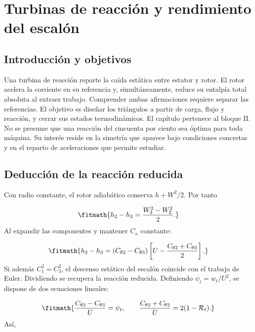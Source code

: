 \documentclass[10pt,openany]{book}
\begin{document}
\studiumchaptercheck

\chapter{Turbinas de reacción y rendimiento del escalón}
\label{chap:c05}


\section{Introducción y objetivos}

Una turbina de reacción reparte la caída estática entre estator y rotor. El rotor acelera la corriente en su referencia y, simultáneamente, reduce su entalpía total absoluta al extraer trabajo. Comprender ambas afirmaciones requiere separar las referencias. El objetivo es diseñar los triángulos a partir de carga, flujo y reacción, y cerrar sus estados termodinámicos.
El capítulo pertenece al bloque II. No se presume que una reacción del cincuenta por ciento sea óptima para toda máquina. Su interés reside en la simetría que aparece bajo condiciones concretas y en el reparto de aceleraciones que permite estudiar.

\section{Deducción de la reacción reducida}


Con radio constante, el rotor adiabático conserva \(h+W^2/2\). Por tanto



\[
\fitmath{h_2-h_3=\frac{W_3^2-W_2^2}{2}.}
\]
Al expandir las componentes y mantener \(C_x\) constante:

\[
\fitmath{h_2-h_3=(C_{\theta2}-C_{\theta3})\left[U-\frac{C_{\theta2}+C_{\theta3}}{2}\right].}
\]
Si además \(C_1^2=C_3^2\), el descenso estático del escalón coincide con el trabajo de Euler. Dividiendo se recupera la reacción reducida. Definiendo \(\psi_t=w_t/U^2\), se dispone de dos ecuaciones lineales:

\[
\fitmath{\frac{C_{\theta2}-C_{\theta3}}{U}=\psi_t,\qquad
\frac{C_{\theta2}+C_{\theta3}}{U}=2(1-\mathcal R_t).}
\]
Así,
\end{document}
